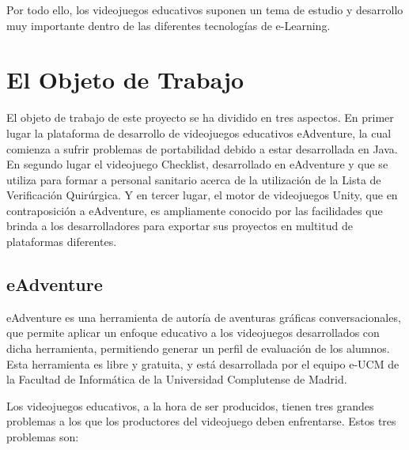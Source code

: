 Por todo ello, los videojuegos educativos suponen un tema de estudio y desarrollo muy importante dentro de las diferentes tecnologías de e-Learning.

\chapter{El Objeto de Trabajo}
\label{objetodetrabajo}

El objeto de trabajo de este proyecto se ha dividido en tres aspectos. En primer lugar la plataforma de desarrollo de videojuegos educativos eAdventure, la cual comienza a sufrir problemas de portabilidad debido a estar desarrollada en Java. En segundo lugar el videojuego Checklist, desarrollado en eAdventure y que se utiliza para formar a personal sanitario acerca de la utilización de la Lista de Verificación Quirúrgica. Y en tercer lugar, el motor de videojuegos Unity, que en contraposición a eAdventure, es ampliamente conocido por las facilidades que brinda a los desarrolladores para exportar sus proyectos en multitud de plataformas diferentes.

\section{eAdventure}
\label{eadventure}

eAdventure es una herramienta de autoría de aventuras gráficas conversacionales, que permite aplicar un enfoque educativo a los videojuegos desarrollados con dicha herramienta, permitiendo generar un perfil de evaluación de los alumnos. Esta herramienta es libre y gratuita, y está desarrollada por el equipo e-UCM de la Facultad de Informática de la Universidad Complutense de Madrid.

Los videojuegos educativos, a la hora de ser producidos, tienen tres grandes problemas a los que los productores del videojuego deben enfrentarse. Estos tres problemas son: 


